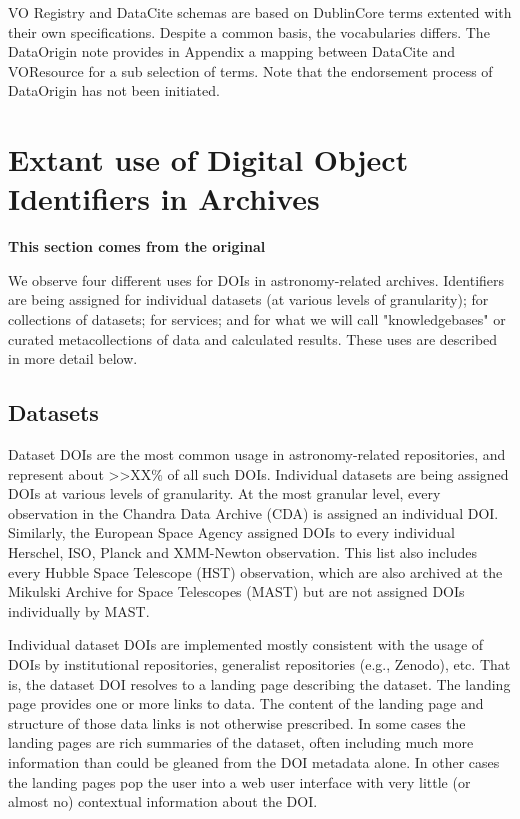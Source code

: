 \documentclass[11pt,a4paper]{ivoa}
\begin{document}
VO Registry and DataCite schemas are based on DublinCore terms extented with their own specifications. Despite a common basis, the vocabularies differs. 
The DataOrigin note provides in Appendix a mapping between DataCite and VOResource for a sub selection of terms. Note that the endorsement process of DataOrigin has not been initiated.
 
 
\section{Extant use of Digital Object Identiﬁers in Archives}
\textbf{\color{red} This section comes from the original}

\label{sec:usage}
We observe four different uses for DOIs in astronomy-related archives.
Identifiers are being assigned for individual datasets (at various levels of granularity); for collections of datasets; for services; and for what we will call "knowledgebases" or curated metacollections of data and calculated results. 
These uses are described in more detail below.

\subsection{Datasets}
\label{sec:intro:datasets}

Dataset DOIs are the most common usage in astronomy-related repositories, and represent about >>XX\% of all such DOIs.
Individual datasets are being assigned DOIs at various levels of granularity. 
At the most granular level, every observation in the Chandra Data Archive (CDA) is assigned an individual DOI.
Similarly, the European Space Agency assigned DOIs to every individual Herschel, ISO, Planck and XMM-Newton observation. 
This list also includes every Hubble Space Telescope (HST) observation, which are also archived at the Mikulski Archive for Space Telescopes (MAST) but are not assigned DOIs individually by MAST.

Individual dataset DOIs are implemented mostly consistent with the usage of DOIs by institutional repositories, generalist repositories (e.g., Zenodo), etc.
That is, the dataset DOI resolves to a landing page describing the dataset.
The landing page provides one or more links to data.
The content of the landing page and structure of those data links is not otherwise prescribed. 
In some cases the landing pages are rich summaries of the dataset, often including much more information than could be gleaned from the DOI metadata alone.
In other cases the landing pages pop the user into a web user interface with very little (or almost no) contextual information about the DOI. 
\end{document}
